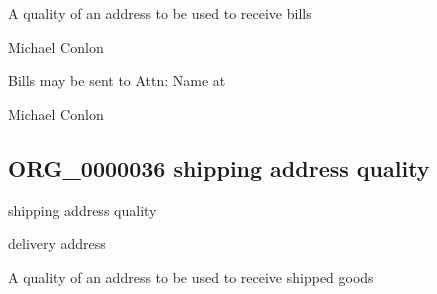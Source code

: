 \documentclass[letterpaper,10pt,english]{sphinxmanual}
\begin{document}
\begin{sphinxShadowBox}

\sphinxAtStartPar
A quality of an address to be used to receive bills
\end{sphinxShadowBox}

\begin{sphinxShadowBox}

\sphinxAtStartPar
Michael Conlon 
\end{sphinxShadowBox}

\begin{sphinxShadowBox}

\sphinxAtStartPar
Bills may be sent to Attn: Name at
\end{sphinxShadowBox}

\begin{sphinxShadowBox}

\sphinxAtStartPar
Michael Conlon 
\end{sphinxShadowBox}
\begin{quote}

\ignorespaces \end{quote}


\subsection{ORG\_0000036 \sphinxhyphen{} shipping address quality}
\label{\detokenize{doc-ORG_0000036:org-0000036-shipping-address-quality}}\label{\detokenize{doc-ORG_0000036:index-0}}\label{\detokenize{doc-ORG_0000036::doc}}
\begin{sphinxShadowBox}

\sphinxAtStartPar
shipping address quality
\end{sphinxShadowBox}

\begin{sphinxShadowBox}

\sphinxAtStartPar
delivery address
\end{sphinxShadowBox}

\begin{sphinxShadowBox}

\sphinxAtStartPar
A quality of an address to be used to receive shipped goods
\end{sphinxShadowBox}
\end{document}
